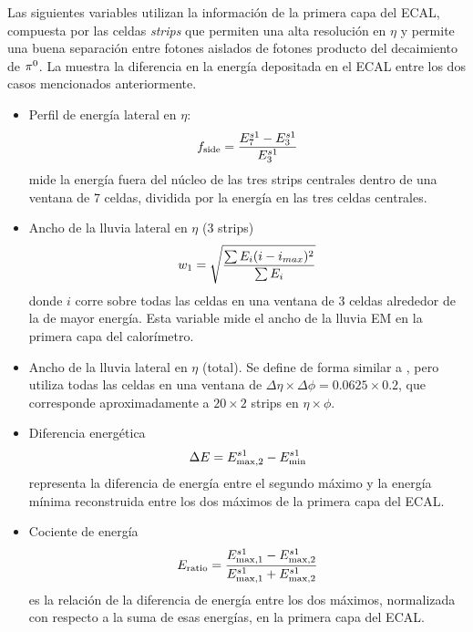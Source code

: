 Las siguientes variables utilizan la información de la primera capa del \ac{ECAL}, compuesta por las celdas \textit{strips} que permiten una alta resolución en \(\eta\) y permite una buena separación entre fotones aislados de fotones producto del decaimiento de \(\pi^{0}\). La \Fig{\ref{fig:pid_ss:ss:pizero}} muestra la diferencia en la energía depositada en el \ac{ECAL} entre los dos casos mencionados anteriormente.
\begin{itemize}
    \item Perfil de energía lateral en \(\eta\):
        \begin{equation}
            f_{\text{side}} = \frac{E_7^{s1} - E_3^{s1}}{E_3^{s1}}
        \end{equation}
        mide la energía fuera del núcleo de las tres strips centrales dentro de una ventana de 7 celdas, dividida por la energía en las tres celdas centrales.
    \item Ancho de la lluvia lateral en \(\eta\) (3 strips)
        \begin{equation}
            w_{1} = \sqrt{
                \frac{\sum E_i (i - i_{max})^2}{\sum E_i}
            }
        \end{equation}
        donde \(i\) corre sobre todas las celdas en una ventana de 3 celdas alrededor de la de mayor energía. Esta variable mide el ancho de la lluvia \ac{EM} en la primera capa del calorímetro.
    \item Ancho de la lluvia lateral en \(\eta\) (total).
        Se define de forma similar a \wone, pero utiliza todas las celdas en una ventana de \(\Delta\eta\times\Delta\phi=0.0625\times 0.2\), que corresponde aproximadamente a \(20\times 2\) strips en \(\eta\times\phi\).
    \item Diferencia energética
        \begin{equation}
            \Delta E = E_{\text{max}, 2}^{s1} - E_{\text{min}}^{s1}
        \end{equation}
        representa la diferencia de energía entre el segundo máximo y la energía mínima reconstruida entre los dos máximos de la primera capa del \ac{ECAL}.
    \item Cociente de energía
        \begin{equation}
            E_{\text{ratio}} = \frac{
                E_{\text{max}, 1}^{s1} - E_{\text{max}, 2}^{s1}
            }{
                E_{\text{max}, 1}^{s1} + E_{\text{max}, 2}^{s1}
            }
        \end{equation}
        es la relación de la diferencia de energía entre los dos máximos, normalizada con respecto a la suma de esas energías, en la primera capa del \ac{ECAL}.
\end{itemize}

